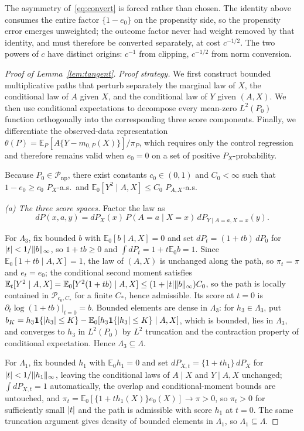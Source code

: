 \documentclass[11pt]{article}
\theoremstyle{plain}
\theoremstyle{definition}
\theoremstyle{remark}
\newcommand{\E}{\mathbb{E}}
\newcommand{\cP}{\mathcal{P}}
\newcommand{\ez}{e_0}
\newcommand{\Linf}[1]{\lVert #1 \rVert_{\infty}}
\DeclarePairedDelimiter{\abs}{\lvert}{\rvert}
\begin{document}
\noindent The asymmetry of~\eqref{eq:convert} is forced rather than chosen. The
identity above consumes the entire factor $\{1-\ez\}$ on the propensity side,
so the propensity error emerges unweighted; the outcome factor never had weight
removed by that identity, and must therefore be converted separately, at cost
$c^{-1/2}$. The two powers of $c$ have distinct origins: $c^{-1}$ from clipping,
$c^{-1/2}$ from norm conversion.

\begin{proof}[Proof of Lemma~\ref{lem:tangent}]
\emph{Proof strategy.} We first construct bounded multiplicative paths that
perturb separately the marginal law of $X$, the conditional law of $A$
given $X$, and the conditional law of $Y$ given $(A,X)$. We then use
conditional expectations to decompose every mean-zero $L^2(P_0)$ function
orthogonally into the corresponding three score components. Finally, we
differentiate the observed-data representation
$\theta(P)=\E_P[A\{Y-m_{0,P}(X)\}]/\pi_P$, which requires only the control
regression and therefore remains valid when $\ez=0$ on a set of positive
$P_X$-probability.

Because $P_0\in\cP_{\mathrm{np}}$, there exist constants $c_0\in(0,1)$ and
$C_0<\infty$ such that $1-\ez\ge c_0$ $P_X$-a.s.\ and
$\E_0[Y^2\mid A,X]\le C_0$ $P_{A,X}$-a.s.

\emph{(a) The three score spaces.} Factor the law as
\[
  dP(x,a,y)=dP_X(x)\,P(A=a\mid X=x)\,dP_{Y\mid A=a,X=x}(y).
\]

For $\Lambda_3$, fix bounded $b$ with $\E_0[b\mid A,X]=0$ and set
$dP_t=(1+tb)\,dP_0$ for $\abs t<1/\Linf b$, so $1+tb\ge0$ and
$\int dP_t=1+t\E_0b=1$. Since $\E_0[1+tb\mid A,X]=1$, the law of $(A,X)$ is
unchanged along the path, so $\pi_t=\pi$ and $e_t=\ez$; the conditional
second moment satisfies
$\E_t[Y^2\mid A,X]=\E_0[Y^2(1+tb)\mid A,X]\le(1+\abs t\Linf b)C_0$, so the
path is locally contained in $\cP_{c_0,C_*}$ for a finite $C_*$, hence
admissible. Its score at $t=0$ is $\partial_t\log(1+tb)\vert_{t=0}=b$.
Bounded elements are dense in $\Lambda_3$: for $h_3\in\Lambda_3$, put
$b_K=h_3\mathbf1\{\abs{h_3}\le K\}-\E_0[h_3\mathbf1\{\abs{h_3}\le K\}\mid A,X]$,
which is bounded, lies in $\Lambda_3$, and converges to $h_3$ in $L^2(P_0)$
by $L^2$ truncation and the contraction property of conditional
expectation. Hence $\Lambda_3\subseteq\Lambda$.

For $\Lambda_1$, fix bounded $h_1$ with $\E_0h_1=0$ and set
$dP_{X,t}=\{1+th_1\}\,dP_X$ for $\abs t<1/\Linf{h_1}$, leaving the
conditional laws of $A\mid X$ and $Y\mid A,X$ unchanged; $\int dP_{X,t}=1$
automatically, the overlap and conditional-moment bounds are untouched, and
$\pi_t=\E_0[\{1+th_1(X)\}\ez(X)]\to\pi>0$, so $\pi_t>0$ for sufficiently
small $\abs t$ and the path is admissible with score $h_1$ at $t=0$. The
same truncation argument gives density of bounded elements in $\Lambda_1$,
so $\Lambda_1\subseteq\Lambda$.


\end{proof}
\end{document}
